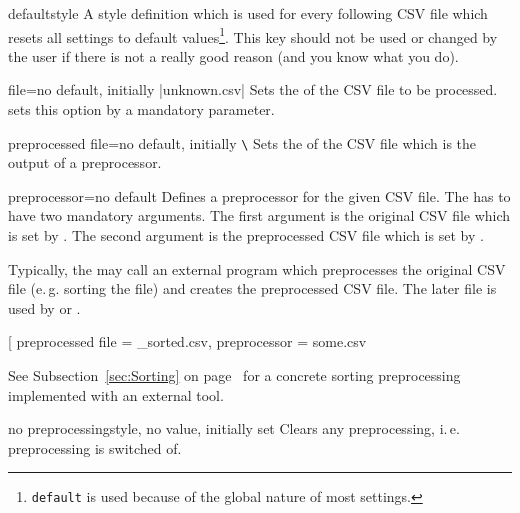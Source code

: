 \documentclass[a4paper,11pt]{ltxdoc}
\begin{document}
\begin{docCsvKey}{default}{}{style}
  A style definition which is used for every following CSV file which
  resets all settings to default values\footnote{\texttt{default} is used
  because of the global nature of most settings.}.
  This key should not be used or changed by the user if there is not a
  really good reason (and you know what you do).
\end{docCsvKey}


\begin{docCsvKey}{file}{=}{no default, initially |unknown.csv|}
  Sets the  of the CSV file to be processed.
   sets this option by a mandatory parameter.
\end{docCsvKey}


\begin{docCsvKey}{preprocessed file}{=}{no default, initially \texttt{\textbackslash{}}}
  Sets the  of the CSV file which is the output of a
  preprocessor.
\end{docCsvKey}


\begin{docCsvKey}{preprocessor}{=}{no default}
  Defines a preprocessor for the given CSV file.
  The  has to have two mandatory arguments. The first argument
  is the original CSV file which is set by .
  The second argument is the preprocessed CSV file
  which is set by .\par\smallskip
  Typically, the  may call an external program which preprocesses
  the original CSV file (e.\,g. sorting the file) and creates the
  preprocessed CSV file. The later file is used by 
  or .
\begin{dispListing}
\newcommand{\mySortTool}[2]{%
}

\csvreader[%
    preprocessed file = \jobname_sorted.csv,
    preprocessor      = \mySortTool,
  ]{some.csv}{}{%
}
\end{dispListing}
See Subsection~\ref{sec:Sorting} on page~\pageref{sec:Sorting} for a
concrete sorting preprocessing implemented with an external tool.
\end{docCsvKey}


\begin{docCsvKey}{no preprocessing}{}{style, no value, initially set}
  Clears any preprocessing, i.\,e. preprocessing is switched of.
\end{docCsvKey}
\end{document}
